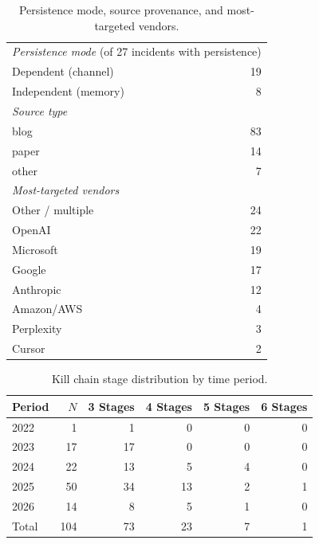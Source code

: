 \begin{table}[t]
\centering
\caption{Persistence mode, source provenance, and most-targeted vendors.}
\label{tab:aux}
\begin{tabular}{lr}
\toprule
\multicolumn{2}{l}{\emph{Persistence mode} (of 27 incidents with persistence)} \\
\quad Dependent (channel) & 19 \\
\quad Independent (memory) & 8 \\
\midrule
\multicolumn{2}{l}{\emph{Source type}} \\
\quad blog & 83 \\
\quad paper & 14 \\
\quad other & 7 \\
\midrule
\multicolumn{2}{l}{\emph{Most-targeted vendors}} \\
\quad Other / multiple & 24 \\
\quad OpenAI & 22 \\
\quad Microsoft & 19 \\
\quad Google & 17 \\
\quad Anthropic & 12 \\
\quad Amazon/AWS & 4 \\
\quad Perplexity & 3 \\
\quad Cursor & 2 \\
\bottomrule
\end{tabular}
\end{table}

\begin{table}[t]
\centering
\caption{Kill chain stage distribution by time period.}
\label{tab:stage-dist-period}
\begin{tabular}{l r rrrr}
\toprule
Period & $N$ & 3 Stages & 4 Stages & 5 Stages & 6 Stages \\
\midrule
2022 & 1 & 1 & 0 & 0 & 0 \\
2023 & 17 & 17 & 0 & 0 & 0 \\
2024 & 22 & 13 & 5 & 4 & 0 \\
2025 & 50 & 34 & 13 & 2 & 1 \\
2026 & 14 & 8 & 5 & 1 & 0 \\
\midrule
Total & 104 & 73 & 23 & 7 & 1 \\
\bottomrule
\end{tabular}
\end{table}
